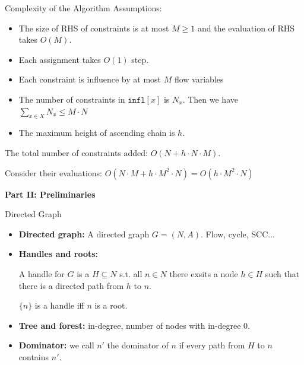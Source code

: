 \documentclass[aspectratio=1610, 13pt]{beamer}
\begin{document}
\begin{frame}{Complexity of the Algorithm}
Assumptions:
\begin{itemize}
\item The size of RHS of constraints is at most $M \ge 1$ and the evaluation of RHS takes $O(M)$.
\item Each assignment takes $O(1)$ step.
\item Each constraint is influence by at most $M$ flow variables
\item The number of constraints in $\texttt{infl}[x]$ is $N_x$. Then we have $\sum_{x\in X } N_x \le M\cdot N$
\item The maximum height of ascending chain is $h$.
\end{itemize}

The total number of constraints added: $O(N + h\cdot N\cdot M)$.

Consider their evaluations: $O(N\cdot M + h\cdot M^2\cdot N) = O(h\cdot M^2\cdot N)$
\end{frame}

\begin{frame}
\begin{center}

\Large
\textbf{Part II: Preliminaries}
\end{center}



\end{frame}

\begin{frame}{Directed Graph}
\begin{itemize}

\item \textbf{Directed graph: } A directed graph $G = (N, A)$. Flow, cycle, SCC...

\item\textbf{Handles and roots: } 

A handle for $G$ is a $H \subseteq N$ s.t. all $n\in N$ there exsits a node $h\in H$ such that there is a directed path from $h$ to $n$.

$\{n\}$ is a handle iff $n$ is a root.

\item\textbf{Tree and forest:} in-degree, number of nodes with in-degree 0.

\item \textbf{Dominator:} we call $n'$ the dominator of $n$ if every path from $H$ to $n$ contains $n'$.

\end{itemize}



\end{frame} 
\end{document}
